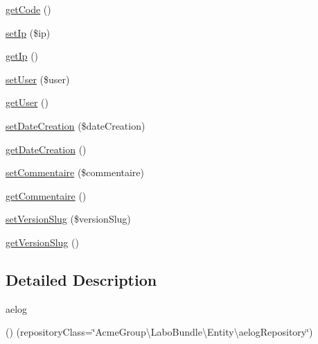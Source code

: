 \begin{DoxyCompactItemize}
\item 
\hyperlink{class_acme_group_1_1_labo_bundle_1_1_entity_1_1aelog_ae6305edeb89c08e91a3a2393d4d59fd7}{get\+Code} ()
\item 
\hyperlink{class_acme_group_1_1_labo_bundle_1_1_entity_1_1aelog_a69e40cbcaa1741da014bd179831a2254}{set\+Ip} (\$ip)
\item 
\hyperlink{class_acme_group_1_1_labo_bundle_1_1_entity_1_1aelog_a278fe9818382c5e534f29347e6e251e1}{get\+Ip} ()
\item 
\hyperlink{class_acme_group_1_1_labo_bundle_1_1_entity_1_1aelog_ac5b7353adaa754385d0b220e753b9677}{set\+User} (\$user)
\item 
\hyperlink{class_acme_group_1_1_labo_bundle_1_1_entity_1_1aelog_a831ba15eca9f84e47c07130f77a4438d}{get\+User} ()
\item 
\hyperlink{class_acme_group_1_1_labo_bundle_1_1_entity_1_1aelog_a39ce6b540958872dc546a181d43d9aaa}{set\+Date\+Creation} (\$date\+Creation)
\item 
\hyperlink{class_acme_group_1_1_labo_bundle_1_1_entity_1_1aelog_a619440ad9bbbf61465e0377b53373eb7}{get\+Date\+Creation} ()
\item 
\hyperlink{class_acme_group_1_1_labo_bundle_1_1_entity_1_1aelog_a04497ae10b2859790a167f1ea2bfe5d6}{set\+Commentaire} (\$commentaire)
\item 
\hyperlink{class_acme_group_1_1_labo_bundle_1_1_entity_1_1aelog_ae288a972b38b24befd903a140ae02091}{get\+Commentaire} ()
\item 
\hyperlink{class_acme_group_1_1_labo_bundle_1_1_entity_1_1aelog_a719539e6971fcc50635f92e64749d0f8}{set\+Version\+Slug} (\$version\+Slug)
\item 
\hyperlink{class_acme_group_1_1_labo_bundle_1_1_entity_1_1aelog_a289caa7e94f6887d03d830288f3a5047}{get\+Version\+Slug} ()
\end{DoxyCompactItemize}


\subsection{Detailed Description}
aelog

() (repository\+Class=\char`\"{}\+Acme\+Group\textbackslash{}\+Labo\+Bundle\textbackslash{}\+Entity\textbackslash{}aelog\+Repository\char`\"{}) 

